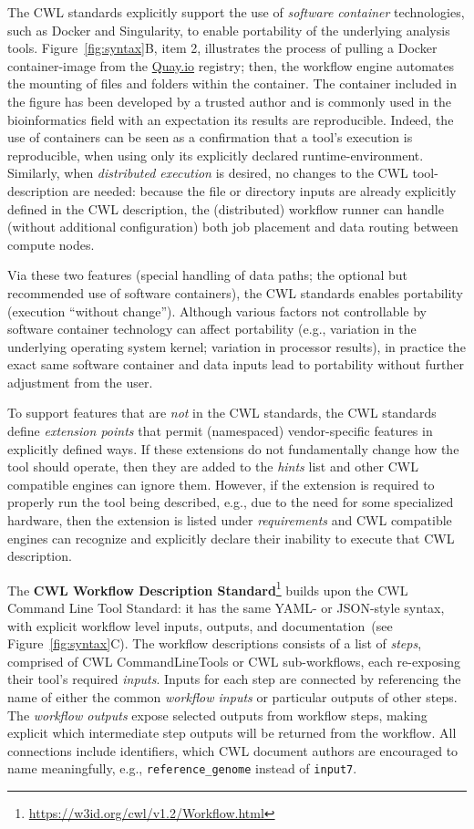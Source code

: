 {The CWL standards explicitly support the use of \textit{software container} technologies, such as Docker and Singularity, to enable portability of the underlying analysis tools. Figure~\ref{fig:syntax}B, item 2, illustrates the process of pulling a Docker container-image from the \url{Quay.io} registry; then, the workflow engine automates the mounting of files and folders within the container. The container included in the figure has been developed by a trusted author and is commonly used in the bioinformatics field with an expectation its results are reproducible. Indeed, the use of containers can be seen as a confirmation that a tool’s execution is reproducible, when using only its explicitly declared runtime-environment. Similarly, when \textit{distributed execution} is desired, no changes to the CWL tool-description are needed: because the file or directory inputs are already explicitly defined in the CWL description, the (distributed) workflow runner can handle (without additional configuration) both job placement and data routing between compute nodes.

Via these two features (special handling of data paths; the optional but recommended use of software containers), the CWL standards enables portability (execution “without change”). Although various factors not controllable by software container technology can affect portability (e.g., variation in the underlying operating system kernel; variation in processor results), in practice the exact same software container and data inputs lead to portability without further adjustment from the user.

To support features that are \textit{not} in the CWL standards, the CWL standards define \textit{extension points} that permit (namespaced) vendor-specific features in explicitly defined ways. If these extensions do not fundamentally change how the tool should operate, then they are added to the \textit{hints} list and other CWL compatible engines can ignore them. However, if the extension is required to properly run the tool being described, e.g., due to the need for some specialized hardware, then the extension is listed under \textit{requirements} and CWL compatible engines can recognize and explicitly declare their inability to execute that CWL description.

The \textbf{CWL Workflow Description Standard}\footnote{\url{https://w3id.org/cwl/v1.2/Workflow.html}} builds upon the CWL Command Line Tool Standard: it has the same YAML- or JSON-style syntax, with explicit workflow level inputs, outputs, and documentation~(see Figure~\ref{fig:syntax}C). The workflow descriptions consists of a list of \textit{steps}, comprised of CWL CommandLineTools or CWL sub-workflows, each re-exposing their tool's required \textit{inputs}. Inputs for each step are connected by referencing the name of either the common \textit{workflow inputs} or particular outputs of other steps. The \textit{workflow outputs} expose selected outputs from workflow steps, making explicit which intermediate step outputs will be returned from the workflow. All connections include identifiers, which CWL document authors are encouraged to name meaningfully, e.g., \texttt{reference\_genome} instead of \texttt{input7}.

}
